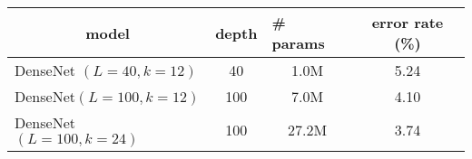 \documentclass[10pt,twocolumn,letterpaper]{article}
\begin{document}
\centering
\small
\begin{tabular}{l|cc|c}
\toprule
\multicolumn{1}{c|}{\bf model} & \multicolumn{1}{l}{\bf depth} & \multicolumn{1}{l|}{\bf \# params}  & \bf error rate (\%)  \\ \midrule
DenseNet $(L=40, k=12)$ \cite{Huang2016Densely} & 40 & 1.0M &  5.24  \\
DenseNet$(L=100, k=12)$ \cite{Huang2016Densely} & 100 & 7.0M &  4.10  \\
DenseNet $(L=100, k=24)$ \cite{Huang2016Densely} & 100 & 27.2M &  3.74  \\ 

\end{tabular}
\end{document}
